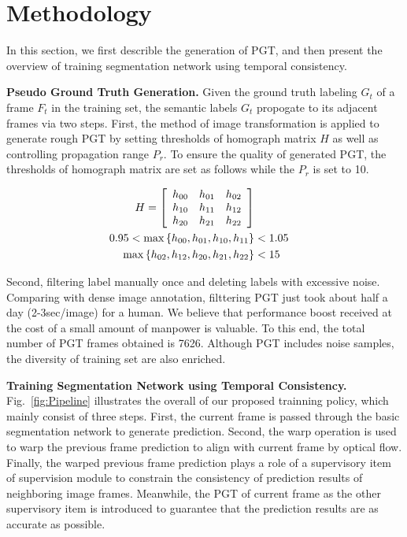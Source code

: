 \section{Methodology}
\label{sec:metho}
In this section, we first describle the generation of PGT, and then present the overview of training segmentation network using temporal consistency.

{\bf Pseudo Ground Truth Generation.}
%
Given the ground truth labeling ${G_t}$ of a frame ${F_t}$ in the training set, the semantic labels ${G_t}$ propogate to its adjacent frames via two steps.
%
First, the method of image transformation is applied to generate rough PGT by setting thresholds of homograph matrix ${H}$ as well as controlling propagation range ${P_r}$.
%
To ensure the quality of generated PGT, the thresholds of homograph matrix are set as follows while the ${P_r}$ is set to 10.

\begin{equation}
\centering
\begin{aligned}
H
=
\left[
\begin{array}{ccc}
h_{00} & h_{01} & h_{02}\\
h_{10} & h_{11} & h_{12}\\
h_{20} & h_{21} & h_{22}\\
\end{array}
\right] \\
0.95<\max{\left\{h_{00},h_{01},h_{10},h_{11}\right\}}&<1.05\\
\max{\left\{h_{02},h_{12},h_{20},h_{21},h_{22}\right\}}&<15\\
\end{aligned}
\end{equation}

Second, filtering label manually once and deleting labels with excessive noise.
%
Comparing with dense image annotation, filttering PGT just took about half a day (2-3sec/image) for a human.
%
We believe that performance boost received at the cost of a small amount of manpower is valuable.
%
To this end, the total number of PGT frames obtained is 7626.
%
Although PGT includes noise samples, the diversity of training set are also enriched. 


{\bf Training Segmentation Network using Temporal Consistency.}
%
Fig.~\ref{fig:Pipeline} illustrates the overall of our proposed trainning policy, which mainly consist of three steps.
%
First, the current frame is passed through the basic segmentation network to generate prediction.
%
Second, the warp operation is used to warp the previous frame prediction to align with current frame by optical flow.
%
Finally, the warped previous frame prediction plays a role of a supervisory item of supervision module to constrain the consistency of prediction results of neighboring image frames.
%
Meanwhile, the PGT of current frame as the other supervisory item is introduced to guarantee that the prediction results are as accurate as possible.



